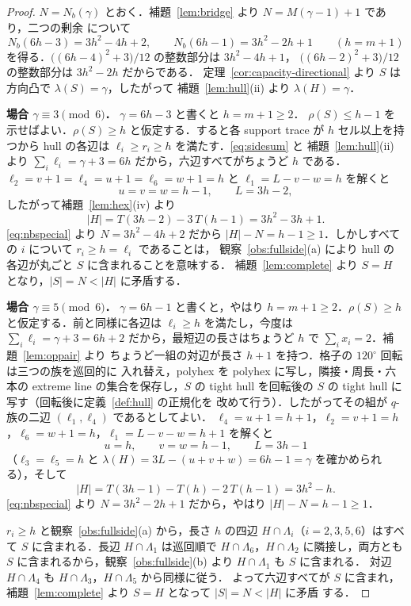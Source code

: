 \documentclass[11pt]{article}
\theoremstyle{plain}
\theoremstyle{definition}
\theoremstyle{remark}
\begin{document}
\begin{proof}
\(N=N_{b}(\gamma)\) とおく．補題~\ref{lem:bridge} より \(N=M(\gamma-1)+1\) であり，二つの剰余
について
\begin{equation}\label{eq:nbspecial}
   N_{b}(6h-3)=3h^{2}-4h+2,\qquad N_{b}(6h-1)=3h^{2}-2h+1\qquad(h=m+1)
\end{equation}
を得る．\(\bigl((6h-4)^{2}+3\bigr)/12\) の整数部分は \(3h^{2}-4h+1\)，
\(\bigl((6h-2)^{2}+3\bigr)/12\) の整数部分は \(3h^{2}-2h\) だからである．
定理~\ref{cor:capacity-directional} より \(S\) は方向凸で \(\lambda(S)=\gamma\)，したがって
補題~\ref{lem:hull}(ii) より \(\lambda(H)=\gamma\)．

\medskip\noindent\textbf{場合 \(\gamma\equiv3\pmod6\)．} \(\gamma=6h-3\) と書くと \(h=m+1\ge2\)．
\(\rho(S)\le h-1\) を示せばよい．\(\rho(S)\ge h\) と仮定する．すると各 support trace が \(h\)
セル以上を持つから hull の各辺は \(\ell_{i}\ge r_{i}\ge h\) を満たす．\eqref{eq:sidesum} と
補題~\ref{lem:hull}(ii) より \(\sum_{i}\ell_{i}=\gamma+3=6h\) だから，六辺すべてがちょうど \(h\)
である．\(\ell_{2}=v+1=\ell_{4}=u+1=\ell_{6}=w+1=h\) と \(\ell_{1}=L-v-w=h\) を解くと
\[
   u=v=w=h-1,\qquad L=3h-2,
\]
したがって補題~\ref{lem:hex}(iv) より
\[
   |H|=T(3h-2)-3\,T(h-1)=3h^{2}-3h+1 .
\]
\eqref{eq:nbspecial} より \(N=3h^{2}-4h+2\) だから \(|H|-N=h-1\ge1\)．しかしすべての \(i\) について \(r_i\ge h=\ell_i\) であることは，
観察~\ref{obs:fullside}(a) により hull の各辺が丸ごと \(S\) に含まれることを意味する．
補題~\ref{lem:complete} より \(S=H\) となり，\(|S|=N<|H|\) に矛盾する．

\medskip\noindent\textbf{場合 \(\gamma\equiv5\pmod6\)．} \(\gamma=6h-1\) と書くと，やはり
\(h=m+1\ge2\)．\(\rho(S)\ge h\) と仮定する．前と同様に各辺は \(\ell_{i}\ge h\) を満たし，今度は
\(\sum_{i}\ell_{i}=\gamma+3=6h+2\) だから，最短辺の長さはちょうど \(h\) で \(\sum_{i}x_{i}=2\)．補題~\ref{lem:oppair} より
ちょうど一組の対辺が長さ \(h+1\) を持つ．格子の \(120^{\circ}\) 回転は三つの族を巡回的に
入れ替え，polyhex を polyhex に写し，隣接・周長・六本の extreme line の集合を保存し，\(S\) の
tight hull を回転後の \(S\) の tight hull に写す（回転後に定義~\ref{def:hull} の正規化を
改めて行う）．したがってその組が \(q\)-族の二辺 \((\ell_1,\ell_4)\) であるとしてよい．
\(\ell_{4}=u+1=h+1\)，\(\ell_{2}=v+1=h\)，\(\ell_{6}=w+1=h\)，\(\ell_{1}=L-v-w=h+1\) を解くと
\[
   u=h,\qquad v=w=h-1,\qquad L=3h-1
\]
（\(\ell_{3}=\ell_{5}=h\) と \(\lambda(H)=3L-(u+v+w)=6h-1=\gamma\) を確かめられる），そして
\[
   |H|=T(3h-1)-T(h)-2\,T(h-1)=3h^{2}-h .
\]
\eqref{eq:nbspecial} より \(N=3h^{2}-2h+1\) だから，やはり \(|H|-N=h-1\ge1\)．

\(r_i\ge h\) と観察~\ref{obs:fullside}(a) から，長さ \(h\) の四辺
\(H\cap\Lambda_i\)（\(i=2,3,5,6\)）はすべて \(S\) に含まれる．長辺
\(H\cap\Lambda_1\) は巡回順で \(H\cap\Lambda_6\)，\(H\cap\Lambda_2\) に隣接し，両方とも
\(S\) に含まれるから，観察~\ref{obs:fullside}(b) より \(H\cap\Lambda_1\) も \(S\) に含まれる．
対辺 \(H\cap\Lambda_4\) も \(H\cap\Lambda_3\)，\(H\cap\Lambda_5\) から同様に従う．
よって六辺すべてが \(S\) に含まれ，補題~\ref{lem:complete} より \(S=H\) となって \(|S|=N<|H|\) に矛盾
する．
\end{proof}
\end{document}
